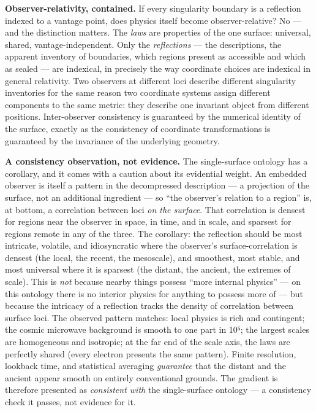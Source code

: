 \documentclass[
]{article}
\begin{document}
\textbf{Observer-relativity, contained.} If every singularity boundary
is a reflection indexed to a vantage point, does physics itself become
observer-relative? No --- and the distinction matters. The \emph{laws}
are properties of the one surface: universal, shared,
vantage-independent. Only the \emph{reflections} --- the descriptions,
the apparent inventory of boundaries, which regions present as
accessible and which as sealed --- are indexical, in precisely the way
coordinate choices are indexical in general relativity. Two observers at
different loci describe different singularity inventories for the same
reason two coordinate systems assign different components to the same
metric: they describe one invariant object from different positions.
Inter-observer consistency is guaranteed by the numerical identity of
the surface, exactly as the consistency of coordinate transformations is
guaranteed by the invariance of the underlying geometry.

\textbf{A consistency observation, not evidence.} The single-surface
ontology has a corollary, and it comes with a caution about its
evidential weight. An embedded observer is itself a pattern in the
decompressed description --- a projection of the surface, not an
additional ingredient --- so ``the observer's relation to a region'' is,
at bottom, a correlation between loci \emph{on the surface}. That
correlation is densest for regions near the observer in space, in time,
and in scale, and sparsest for regions remote in any of the three. The
corollary: the reflection should be most intricate, volatile, and
idiosyncratic where the observer's surface-correlation is densest (the
local, the recent, the mesoscale), and smoothest, most stable, and most
universal where it is sparsest (the distant, the ancient, the extremes
of scale). This is \emph{not} because nearby things possess ``more
internal physics'' --- on this ontology there is no interior physics for
anything to possess more of --- but because the intricacy of a
reflection tracks the density of correlation between surface loci. The
observed pattern matches: local physics is rich and contingent; the
cosmic microwave background is smooth to one part in 10⁵; the largest
scales are homogeneous and isotropic; at the far end of the scale axis,
the laws are perfectly shared (every electron presents the same
pattern). Finite resolution, lookback time, and statistical averaging
\emph{guarantee} that the distant and the ancient appear smooth on
entirely conventional grounds. The gradient is therefore presented as
\emph{consistent with} the single-surface ontology --- a consistency
check it passes, not evidence for it.
\end{document}

